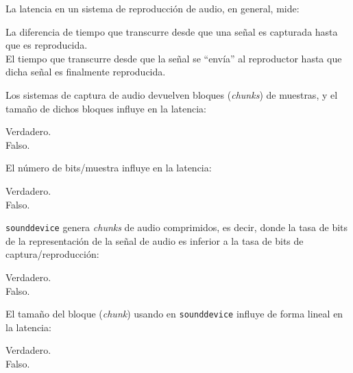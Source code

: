 \documentclass[legalpaper, 12pt, addpoints]{exam}
\begin{document}
\begin{questions}
\vspace{0.10in}

\question La latencia en un sistema de reproducción de audio, en general, mide:

\begin{oneparchoices}
  \choice La diferencia de tiempo que transcurre desde que una señal es capturada hasta que es reproducida.\\
  \choice El tiempo que transcurre desde que la señal se ``envía'' al
  reproductor hasta que dicha señal es finalmente reproducida.
\end{oneparchoices}
  
\vspace{0.10in}

\question Los sistemas de captura de audio devuelven bloques (\emph{chunks})
de muestras, y el tamaño de dichos bloques influye en la latencia:

\begin{oneparchoices}
  \choice Verdadero.\\
  \choice Falso.
\end{oneparchoices}
  
\vspace{0.10in}

\question El número de bits/muestra influye en la latencia:

\begin{oneparchoices}
  \choice Verdadero.\\
  \choice Falso.
\end{oneparchoices}
  
\vspace{0.10in}

\question \texttt{sounddevice} genera \emph{chunks} de audio
comprimidos, es decir, donde la tasa de bits de la representación de
la señal de audio es inferior a la tasa de bits de
captura/reproducción:

\begin{oneparchoices}
  \choice Verdadero.\\
  \choice Falso.
\end{oneparchoices}
  
\vspace{0.10in}

\question El tamaño del bloque (\emph{chunk}) usando en \texttt{sounddevice}
influye de forma lineal en la latencia:

\begin{oneparchoices}
  \choice Verdadero.\\
  \choice Falso.
\end{oneparchoices}
  

\end{questions}
\end{document}
